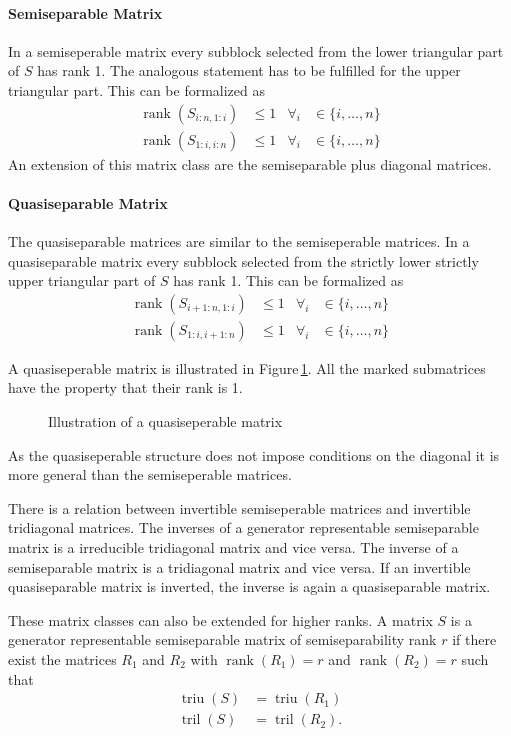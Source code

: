 \documentclass[doctype=mastersthesis,BCOR=15mm,biblatex]{ldvbook}%
\DeclareMathOperator{\rank}{rank}
\DeclareMathOperator{\triu}{triu}
\DeclareMathOperator{\tril}{tril}
\begin{document}
\paragraph{Semiseparable Matrix}
In a semiseperable matrix every subblock selected from the lower triangular part of $S$ has rank 1. The analogous statement has to be fulfilled for the upper triangular part.
This can be formalized as 
\begin{align}
	\rank(S_{i:n,1:i}) &\leq 1 & \forall_i &\in\{i,\dots,n\}\\
	\rank(S_{1:i,i:n}) &\leq 1 & \forall_i &\in\{i,\dots,n\}
\end{align}
An extension of this matrix class are the semiseparable plus diagonal matrices.

\paragraph{Quasiseparable Matrix}
The quasiseparable matrices are similar to the semiseperable matrices. In a quasiseparable matrix every subblock selected from the strictly lower strictly upper triangular part of $S$ has rank 1. 
This can be formalized as 
\begin{align}
\rank(S_{i+1:n,1:i}) &\leq 1 & \forall_i &\in\{i,\dots,n\}\\
\rank(S_{1:i,i+1:n}) &\leq 1 & \forall_i &\in\{i,\dots,n\}
\end{align}

A quasiseperable matrix is illustrated in Figure\,\ref{fig:quasiseperable}. All the marked submatrices have the property that their rank is 1.
\begin{figure}
	\centering
	
	\caption{Illustration of a quasiseperable matrix}
	\label{fig:quasiseperable}
\end{figure}
As the quasiseperable structure does not impose conditions on the diagonal it is more general than the semiseperable matrices.

There is a relation between invertible semiseperable matrices and invertible tridiagonal matrices.
The inverses of a generator representable semiseparable matrix is a irreducible tridiagonal matrix and vice versa. 
The inverse of a semiseparable matrix is a tridiagonal matrix and vice versa.
If an invertible quasiseparable matrix is inverted, the inverse is again a quasiseparable matrix.

These matrix classes can also be extended for higher ranks.
A matrix $S$ is a generator representable semiseparable matrix of semiseparability rank $r$ if there exist the matrices $R_1$ and $R_2$ with $\rank(R_1)=r$ and $\rank(R_2)=r$ such that
\begin{align}
\triu(S) &= \triu(R_1)\\
\tril(S) &= \tril(R_2)
.
\end{align}
\end{document}
